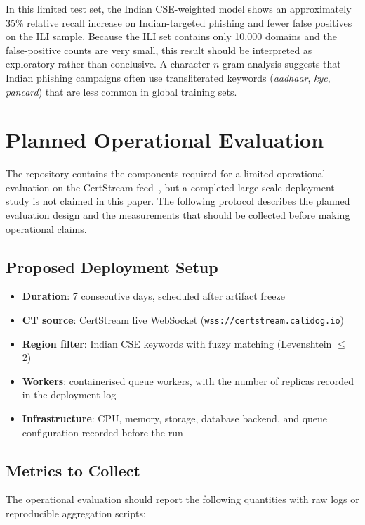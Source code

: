 \documentclass[conference]{IEEEtran}
\begin{document}
In this limited test set, the Indian CSE-weighted model shows an approximately 35\% relative recall increase on Indian-targeted phishing and fewer false positives on the ILI sample. Because the ILI set contains only 10,000 domains and the false-positive counts are very small, this result should be interpreted as exploratory rather than conclusive. A character $n$-gram analysis suggests that Indian phishing campaigns often use transliterated keywords (\textit{aadhaar}, \textit{kyc}, \textit{pancard}) that are less common in global training sets.

\section{Planned Operational Evaluation}
\label{sec:live}

The repository contains the components required for a limited operational evaluation on the CertStream feed~\cite{certstream}, but a completed large-scale deployment study is not claimed in this paper. The following protocol describes the planned evaluation design and the measurements that should be collected before making operational claims.

\subsection{Proposed Deployment Setup}

\begin{itemize}
    \item \textbf{Duration}: 7 consecutive days, scheduled after artifact freeze
    \item \textbf{CT source}: CertStream live WebSocket (\texttt{wss://certstream.calidog.io})~\cite{certstream}
    \item \textbf{Region filter}: Indian CSE keywords with fuzzy matching (Levenshtein $\leq$ 2)
    \item \textbf{Workers}: containerised queue workers, with the number of replicas recorded in the deployment log
    \item \textbf{Infrastructure}: CPU, memory, storage, database backend, and queue configuration recorded before the run
\end{itemize}

\subsection{Metrics to Collect}

The operational evaluation should report the following quantities with raw logs or reproducible aggregation scripts:
\end{document}
